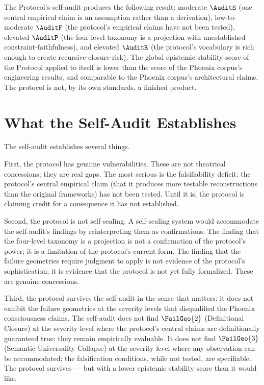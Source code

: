 \begin{auditprop}
\label{ap:self-audit-result}
The \Ortyx{} Protocol's self-audit produces the
following result: moderate $\AuditS$ (one central
empirical claim is an assumption rather than a
derivation), low-to-moderate $\AuditF$ (the protocol's
empirical claims have not been tested), elevated
$\AuditP$ (the four-level taxonomy is a projection
with unestablished constraint-faithfulness), and
elevated $\AuditR$ (the protocol's vocabulary is
rich enough to create recursive closure risk). The
global epistemic stability score of the \Ortyx{}
Protocol applied to itself is lower than the score
of the Phoenix corpus's engineering results, and
comparable to the Phoenix corpus's architectural claims.
The protocol is not, by its own standards, a finished
product.
\end{auditprop}

\section{What the Self-Audit Establishes}
\label{sec:self-audit-establishes}

The self-audit establishes several things.

First, the protocol has genuine vulnerabilities. These
are not theatrical concessions; they are real gaps.
The most serious is the falsifiability deficit: the
protocol's central empirical claim (that it produces
more testable reconstructions than the original
frameworks) has not been tested. Until it is, the
protocol is claiming credit for a consequence it has
not established.

Second, the protocol is not self-sealing. A self-sealing
system would accommodate the self-audit's findings
by reinterpreting them as confirmations. The finding
that the four-level taxonomy is a projection is not
a confirmation of the protocol's power; it is a
limitation of the protocol's current form. The finding
that the failure geometries require judgment to apply
is not evidence of the protocol's sophistication;
it is evidence that the protocol is not yet fully
formalized. These are genuine concessions.

Third, the protocol survives the self-audit in the
sense that matters: it does not exhibit the failure
geometries at the severity levels that disqualified
the Phoenix consciousness claims. The self-audit does
not find $\FailGeo{2}$ (Definitional Closure) at
the severity level where the protocol's central claims
are definitionally guaranteed true; they remain
empirically evaluable. It does not find $\FailGeo{3}$
(Semantic Universality Collapse) at the severity level
where any observation can be accommodated; the
falsification conditions, while not tested, are
specifiable. The protocol survives --- but with a
lower epistemic stability score than it would like.

